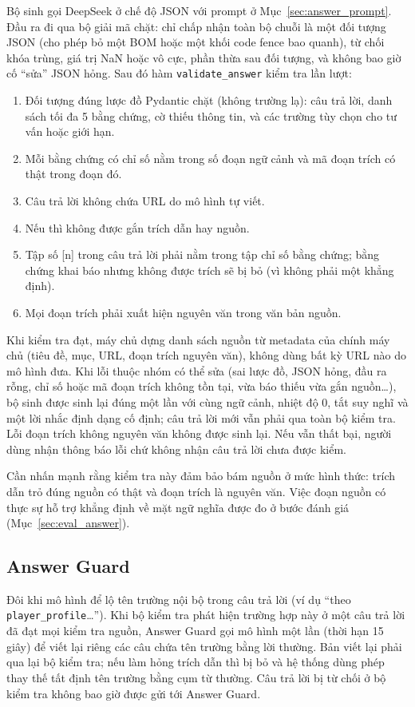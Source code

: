 Bộ sinh gọi DeepSeek ở chế độ JSON với prompt ở Mục~\ref{sec:answer_prompt}. Đầu ra đi qua bộ giải mã chặt: chỉ chấp nhận toàn bộ chuỗi là một đối tượng JSON (cho phép bỏ một BOM hoặc một khối code fence bao quanh), từ chối khóa trùng, giá trị NaN hoặc vô cực, phần thừa sau đối tượng, và không bao giờ cố ``sửa'' JSON hỏng. Sau đó hàm \nolinkurl{validate_answer} kiểm tra lần lượt:
\begin{enumerate}
    \item Đối tượng đúng lược đồ Pydantic chặt (không trường lạ): câu trả lời, danh sách tối đa 5 bằng chứng, cờ thiếu thông tin, và các trường tùy chọn cho tư vấn hoặc giới hạn.
    \item Mỗi bằng chứng có chỉ số nằm trong số đoạn ngữ cảnh và mã đoạn trích có thật trong đoạn đó.
    \item Câu trả lời không chứa URL do mô hình tự viết.
    \item Nếu  thì không được gắn trích dẫn hay nguồn.
    \item Tập số [n] trong câu trả lời phải nằm trong tập chỉ số bằng chứng; bằng chứng khai báo nhưng không được trích sẽ bị bỏ (vì không phải một khẳng định).
    \item Mọi đoạn trích phải xuất hiện nguyên văn trong văn bản nguồn.
\end{enumerate}
Khi kiểm tra đạt, máy chủ dựng danh sách nguồn từ metadata của chính máy chủ (tiêu đề, mục, URL, đoạn trích nguyên văn), không dùng bất kỳ URL nào do mô hình đưa. Khi lỗi thuộc nhóm có thể sửa (sai lược đồ, JSON hỏng, đầu ra rỗng, chỉ số hoặc mã đoạn trích không tồn tại, vừa báo thiếu vừa gắn nguồn\ldots), bộ sinh được sinh lại đúng một lần với cùng ngữ cảnh, nhiệt độ 0, tắt suy nghĩ và một lời nhắc định dạng cố định; câu trả lời mới vẫn phải qua toàn bộ kiểm tra. Lỗi đoạn trích không nguyên văn không được sinh lại. Nếu vẫn thất bại, người dùng nhận thông báo lỗi chứ không nhận câu trả lời chưa được kiểm.

Cần nhấn mạnh rằng kiểm tra này đảm bảo bám nguồn ở mức hình thức: trích dẫn trỏ đúng nguồn có thật và đoạn trích là nguyên văn. Việc đoạn nguồn có thực sự hỗ trợ khẳng định về mặt ngữ nghĩa được đo ở bước đánh giá (Mục~\ref{sec:eval_answer}).

\subsection{Answer Guard}
\label{sec:impl_guard}

Đôi khi mô hình để lộ tên trường nội bộ trong câu trả lời (ví dụ ``theo \nolinkurl{player_profile}\ldots''). Khi bộ kiểm tra phát hiện trường hợp này ở một câu trả lời đã đạt mọi kiểm tra nguồn, Answer Guard gọi mô hình một lần (thời hạn 15 giây) để viết lại riêng các câu chứa tên trường bằng lời thường. Bản viết lại phải qua lại bộ kiểm tra; nếu làm hỏng trích dẫn thì bị bỏ và hệ thống dùng phép thay thế tất định tên trường bằng cụm từ thường. Câu trả lời bị từ chối ở bộ kiểm tra không bao giờ được gửi tới Answer Guard.

